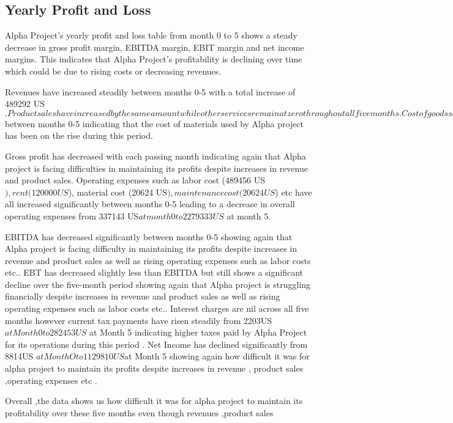 



\subsection{Yearly Profit and Loss}\label{sec:title}
Alpha Project's yearly profit and loss table from month 0 to 5 shows a steady decrease in gross profit margin, EBITDA margin, EBIT margin and net income margins. This indicates that Alpha Project's profitability is declining over time which could be due to rising costs or decreasing revenues. 

Revenues have increased steadily between months 0-5 with a total increase of 489292 US$. Product sales have increased by the same amount while other services remain at zero throughout all five months. Cost of goods sold has also increased steadily during this period with an increase of 2646188 US$ between months 0-5 indicating that the cost of materials used by Alpha project has been on the rise during this period. 

Gross profit has decreased with each passing month indicating again that Alpha project is facing difficulties in maintaining its profits despite increases in revenue and product sales. Operating expenses such as labor cost (489456 US$), rent (120000 US$), material cost (20624 US$), maintenance cost (20624 US$) etc have all increased significantly between months 0-5 leading to a decrease in overall operating expenses from 337143 US$ at month 0 to 2279333 US$ at month 5. 

EBITDA has decreased significantly between months 0-5 showing again that Alpha project is facing difficulty in maintaining its profits despite increases in revenue and product sales as well as rising operating expenses such as labor costs etc.. EBT has decreased slightly less than EBITDA but still shows a significant decline over the five-month period showing again that Alpha project is struggling financially despite increases in revenue and product sales as well as rising operating expenses such as labor costs etc.. Interest charges are nil across all five months however current tax payments have risen steadily from 2203US $ at Month 0 to 282453US $ at Month 5 indicating higher taxes paid by Alpha Project for its operations during this period . Net Income has declined significantly from 8814US $ at Month Oto 1129810US $at Month 5 showing again how difficult it was for alpha project to maintain its profits despite increases in revenue , product sales ,operating expenses etc . 

 Overall ,the data shows us how difficult it was for alpha project to maintain its profitability over these five months even though revenues ,product sales